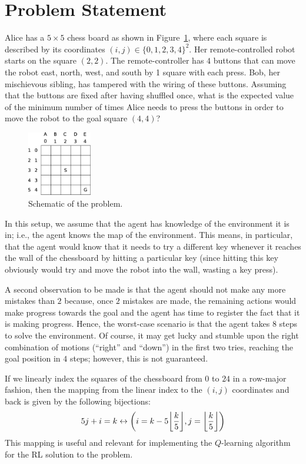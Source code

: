 \section{Problem Statement}
\label{sec:problem}
%
Alice has a $5 \times 5$ chess board as shown in Figure~\ref{fig:problem}, where
each square is described by its coordinates $(i, j) \in \{0, 1, 2, 3, 4\}^2$.
Her remote-controlled robot starts on the square $(2,2)$. The remote-controller
has $4$ buttons that can move the robot east, north, west, and south by 1 square
with each press. Bob, her mischievous sibling, has tampered with the wiring of
these buttons. Assuming that the buttons are fixed after having shuffled once,
what is the expected value of the minimum number of times Alice needs to press
the buttons in order to move the robot to the goal square $(4,4)$?

\begin{figure}[bth]
    \centering
    \includegraphics[width=0.25\textwidth]{./figures/drawing_v1.eps}
    \caption{Schematic of the problem.}
    \label{fig:problem}
\end{figure}
%
In this setup, we assume that the agent has knowledge of the environment it is
in; i.e., the agent knows the map of the environment. This means, in particular,
that the agent would know that it needs to try a different key whenever it 
reaches the wall of the chessboard by hitting a particular key (since hitting 
this key obviously would try and move the robot into the wall, wasting a 
key press).

A second observation to be made is that the agent should not make any more
mistakes than $2$ because, once $2$ mistakes are made, the remaining actions 
would make progress towards the goal and the agent has time to register the 
fact that it is making progress. Hence, the worst-case scenario is that the 
agent takes $8$ steps to solve the environment. Of course, it may get lucky and 
stumble upon the right combination of motions (``right'' and ``down'') in the 
first two tries, reaching the goal position in $4$ steps; however, this is not 
guaranteed.

If we linearly index the squares of the chessboard from $0$ to $24$ in a
row-major fashion, then the mapping from the linear index to the $(i, j)$
coordinates and back is given by the following bijections:
%
\begin{equation}
5j + i = k \leftrightarrow \left(i = k - 5 \floor*{\frac{k}{5}}, j = \floor*{\frac{k}{5}}\right) 
\label{eq:bijection}
\end{equation}
%
This mapping is useful and relevant for implementing the $Q$-learning algorithm
for the RL solution to the problem.
